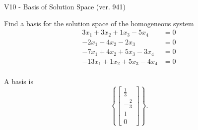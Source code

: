 \begin{exercise}
  \begin{exerciseTitle}V10 - Basis of Solution Space (ver. 941)\end{exerciseTitle}
  \begin{exerciseStatement}
    Find a basis for the solution space of the homogeneous system 
\begin{align*}
 3 x_ 1 + 3 x_ 2 + 1 x_ 3 -5 x_ 4 &= 0  \\ 
  -2 x_ 1 -4 x_ 2 -2 x_ 3 &= 0  \\ 
  -7 x_ 1 + 4 x_ 2 + 5 x_ 3 -3 x_ 4 &= 0  \\ 
  -13 x_ 1 + 1 x_ 2 + 5 x_ 3 -4 x_ 4 &= 0  \\ 
 \end{align*}


 
  \end{exerciseStatement}

  \begin{exerciseAnswer}
   A basis is   
\[\left\{\left[\begin{array}{c}
\frac{1}{3} \\
-\frac{2}{3} \\
1 \\
0
\end{array}\right]\right\}.\]

  


  \end{exerciseAnswer}
\end{exercise}